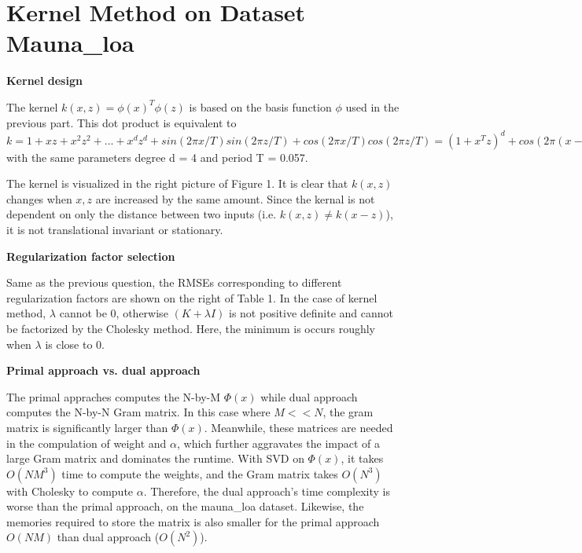\documentclass{article} %
\begin{document}
\section*{Kernel Method on Dataset Mauna\_loa} %

\textbf{Kernel design}

The kernel $k(x, z) = \phi(x)^T \phi(z)$ is based on the basis function $\phi$ used in the previous part. This dot product is equivalent to $k = 1 + xz + x^2z^2 + ... + x^dz^d + sin(2\pi x/T)sin(2\pi z/T) + cos(2\pi x/T)cos(2\pi z/T) = (1+x^Tz)^d + cos(2\pi(x-z)/T)$ with the same parameters degree d = 4 and period T = 0.057.

The kernel is visualized in the right picture of Figure 1. It is clear that $k(x, z)$ changes when $x, z$ are increased by the same amount. Since the kernal is not dependent on only the distance between two inputs (i.e. $k(x, z)\neq k(x-z)$), it is not translational invariant or stationary.

\textbf{Regularization factor selection}

Same as the previous question, the RMSEs corresponding to different regularization factors are shown on the right of Table 1. In the case of kernel method, $\lambda$ cannot be 0, otherwise $(K + \lambda I)$ is not positive definite and cannot be factorized by the Cholesky method. Here, the minimum is occurs roughly when $\lambda$ is close to 0.

\textbf{Primal approach vs. dual approach}

The primal appraches computes the N-by-M $\Phi(x)$ while dual approach computes the N-by-N Gram matrix. In this case where $M<<N$, the gram matrix is significantly larger than $\Phi(x)$. Meanwhile, these matrices are needed in the compulation of weight and $\alpha$, which further aggravates the impact of a large Gram matrix and dominates the runtime. With SVD on $\Phi(x)$, it takes $O(NM^3)$ time to compute the weights, and the Gram matrix takes $O(N^3)$ with Cholesky to compute $\alpha$. Therefore, the dual approach's time complexity is worse than the primal approach, on the mauna\_loa dataset. Likewise, the memories required to store the matrix is also smaller for the primal approach $O(NM)$ than dual approach ($O(N^2)$).


\vspace{0.4cm}
\end{document}
